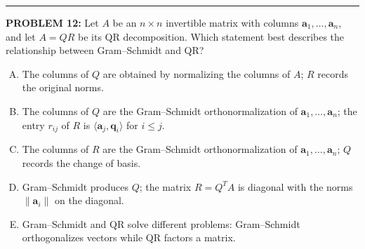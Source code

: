 \documentclass[12pt]{amsart}
\newcommand{\divider}{
  \vspace{-1em} %
  \noindent
  \raisebox{-0.15ex}{\textbullet}%
  \hspace{0.5em}%
  \rule[0.5ex]{0.95\textwidth}{1.0pt}%
  \hspace{0.5em}%
  \raisebox{-0.15ex}{\textbullet}%
  \vspace{0em} %
}
\begin{document}
%
\divider

{\bf PROBLEM 12:}
%
Let $A$ be an $n \times n$ invertible matrix with columns $\mathbf{a}_1, \ldots, \mathbf{a}_n$, and let $A = QR$ be its QR decomposition. Which statement best describes the relationship between Gram--Schmidt and QR?

\begin{enumerate}[(A)]
\item The columns of $Q$ are obtained by normalizing the columns of $A$; $R$ records the original norms.
\item The columns of $Q$ are the Gram--Schmidt orthonormalization of $\mathbf{a}_1, \ldots, \mathbf{a}_n$; the entry $r_{ij}$ of $R$ is $\langle \mathbf{a}_j, \mathbf{q}_i \rangle$ for $i \leq j$.
\item The columns of $R$ are the Gram--Schmidt orthonormalization of $\mathbf{a}_1, \ldots, \mathbf{a}_n$; $Q$ records the change of basis.
\item Gram--Schmidt produces $Q$; the matrix $R = Q^T A$ is diagonal with the norms $\|\mathbf{a}_i\|$ on the diagonal.
\item Gram--Schmidt and QR solve different problems: Gram--Schmidt orthogonalizes vectors while QR factors a matrix.
\end{enumerate}
\end{document}
